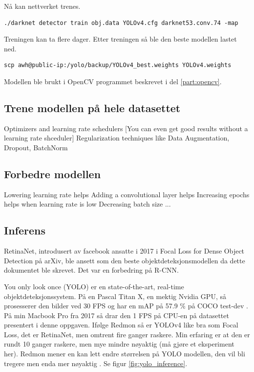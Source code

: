 Nå kan nettverket trenes.

\begin{verbatim}
./darknet detector train obj.data YOLOv4.cfg darknet53.conv.74 -map
\end{verbatim}

Treningen kan ta flere dager. Etter treningen så ble den beste modellen lastet ned.

\begin{verbatim}
scp awh@public-ip:/yolo/backup/YOLOv4_best.weights YOLOv4.weights
\end{verbatim}

Modellen ble brukt i OpenCV programmet beskrevet i del \ref{part:opencv}. 

\subsection{Trene modellen på hele datasettet}

Optimizers and learning rate schedulers [You can even get good results without a learning rate shceduler]
Regularization techniques like Data Augmentation, Dropout, BatchNorm

\subsection{Forbedre modellen}

Lowering learning rate helps
Adding a convolutional layer helps
Increasing epochs helps when learning rate is low
Decreasing batch size ...

\subsection{Inferens}

RetinaNet, introdusert av facebook ansatte i 2017 i Focal Loss for Dense Object Detection på arXiv, ble ansett som den beste objektdeteksjonsmodellen da dette dokumentet ble skrevet. Det var en forbedring på R-CNN. \cite{Lin m.fl. 2017}

You only look once (YOLO) er en state-of-the-art, real-time objektdeteksjonssystem. På en Pascal Titan X, en mektig Nvidia GPU, så prosesserer den bilder ved 30 FPS og har en mAP på 57.9 \% på COCO test-dev \cite{Redmon m.fl. 2020}. På min Macbook Pro fra 2017 så drar den 1 FPS på CPU-en på datasettet presentert i denne oppgaven. Ifølge Redmon så er YOLOv4 like bra som Focal Loss, det er RetinaNet, men omtrent fire ganger raskere. Min erfaring er at den er rundt 10 ganger raskere, men mye mindre nøyaktig (må gjøre et eksperiment her). Redmon mener en kan lett endre størrelsen på YOLO modellen, den vil bli tregere men enda mer nøyaktig \cite{Redmon 2020}. Se figur \ref{fig:yolo_inference}.

